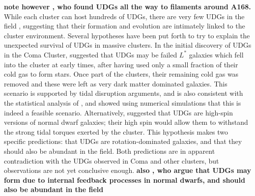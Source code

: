 \documentclass[usenatbib,fleqn]{mnras}
\begin{document}
\textbf{note however \cite{roman16}, who found UDGs all the way to filaments around A168.}
While each cluster can host hundreds of UDGs, there are very few UDGs in the field \citep{vdburg16}, suggesting that their formation and evolution are intimately linked to the cluster environment. Several hypotheses have been put forth to try to explain the unexpected survival of UDGs in massive clusters. In the initial discovery of UDGs in the Coma Cluster, \cite{vandokkum15} suggested that UDGs may be failed $L^*$ galaxies which fell into the cluster at early times, after having used only a small fraction of their cold gas to form stars. Once part of the clusters, their remaining cold gas was removed and these were left as very dark matter dominated galaxies. This scenario is supported by tidal disruption arguments, and is also consistent with the statistical analysis of \cite{vdburg16}, and \cite{yozin15} showed using numerical simulations that this is indeed a feasible scenario. Alternatively, \cite{amorisco16} suggested that UDGs are high-spin versions of normal dwarf galaxies; their high spin would allow them to withstand the strong tidal torques exerted by the cluster. This hypothesis makes two specific predictions: that UDGs are rotation-dominated galaxies, and that they should also be abundant in the field. Both predictions are in apparent contradiction with the UDGs observed in Coma and other clusters, but observations are not yet conclusive enough.
\textbf{also \cite{dicintio16}, who argue that UDGs may form due to internal feedback processes in normal dwarfs, and should also be abundant in the field}
\end{document}
